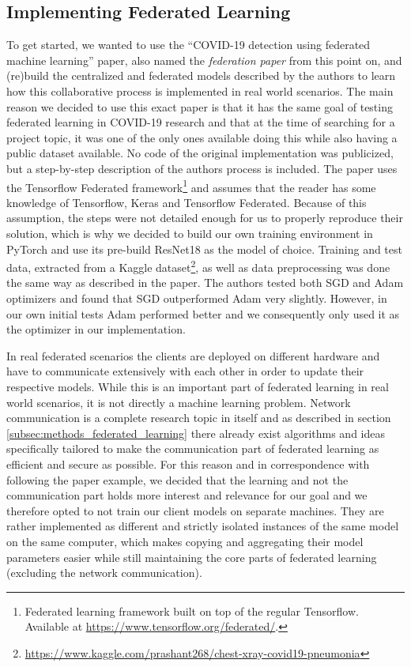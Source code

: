 \subsection{Implementing Federated Learning}\label{subsec:methods_original_paper}
To get started, we wanted to use the \enquote{COVID-19 detection using federated machine learning} paper\cite{federated_machine_learning}, also named the \textit{federation paper} from this point on, and (re)build the centralized and federated models described by the authors to learn how this collaborative process is implemented in real world scenarios. The main reason we decided to use this exact paper is that it has the same goal of testing federated learning in COVID-19 research and that at the time of searching for a project topic, it was one of the only ones available doing this while also having a public dataset available.
No code of the original implementation was publicized, but a step-by-step description of the authors process is included. The paper uses the Tensorflow Federated framework\footnote{Federated learning framework built on top of the regular Tensorflow. Available at \url{https://www.tensorflow.org/federated/}.} and assumes that the reader has some knowledge of Tensorflow, Keras and Tensorflow Federated. Because of this assumption, the steps were not detailed enough for us to properly reproduce their solution, which is why we decided to build our own training environment in PyTorch and use its pre-build ResNet18 as the model of choice. Training and test data, extracted from a Kaggle dataset\footnote{\url{https://www.kaggle.com/prashant268/chest-xray-covid19-pneumonia}}, as well as data preprocessing was done the same way as described in the paper. The authors tested both SGD and Adam optimizers and found that SGD outperformed Adam very slightly. However, in our own initial tests Adam performed better and we consequently only used it as the optimizer in our implementation.

In real federated scenarios the clients are deployed on different hardware and have to communicate extensively with each other in order to update their respective models. While this is an important part of federated learning in real world scenarios, it is not directly a machine learning problem. Network communication is a complete research topic in itself and as described in section \ref{subsec:methods_federated_learning} there already exist algorithms and ideas specifically tailored to make the communication part of federated learning as efficient and secure as possible. For this reason and in correspondence with following the paper example, we decided that the learning and not the communication part holds more interest and relevance for our goal and we therefore opted to not train our client models on separate machines. They are rather implemented as different and strictly isolated instances of the same model on the same computer, which makes copying and aggregating their model parameters easier while still maintaining the core parts of federated learning (excluding the network communication).


